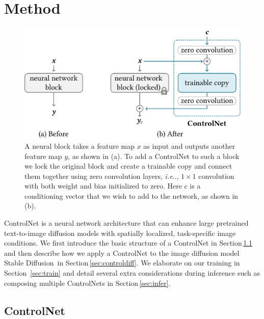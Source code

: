 \documentclass[10pt,twocolumn,letterpaper]{article}
\makeatletter
\DeclareRobustCommand\onedot{\futurelet\@let@token\@onedot}
\def\@onedot{\ifx\@let@token.\else.\null\fi\xspace}
\def\ie{\emph{i.e}\onedot}
\makeatother
\begin{document}
	\section{Method}
	\label{sec:method}
	
	\begin{figure}
		\vspace{-10pt}
		\includegraphics[width=\linewidth]{./imgs/he.pdf}
		\vspace{-17pt}
		\caption{A neural block takes a feature map $x$ as input
			and outputs another feature map $y$, as shown in (a). To add a ControlNet to
			such a block we lock the original block and create a trainable copy 
			and connect them together using zero
			convolution layers, \ie, $1\times 1$ convolution with
			both weight and bias initialized to zero. Here $c$ is a conditioning vector
			that we wish to add to the network, as shown in (b).}
		\vspace{-7pt}
		\label{fig:he}
	\end{figure}
	
	ControlNet is a neural network architecture that can enhance large
	pretrained text-to-image diffusion models with spatially localized,
	task-specific image conditions.  We first introduce the basic
	structure of a ControlNet in Section\,\ref{sec:control} and then
	describe how we apply a ControlNet to the image diffusion model Stable
	Diffusion\,\cite{rombach2021highresolution} in
	Section\,\ref{sec:controldiff}.  We elaborate on our training in
	Section~\ref{sec:train} and detail several extra considerations during
	inference such as composing multiple ControlNets in
	Section\,\ref{sec:infer}.
	
	\subsection{ControlNet}
	\label{sec:control}
	
\end{document}
